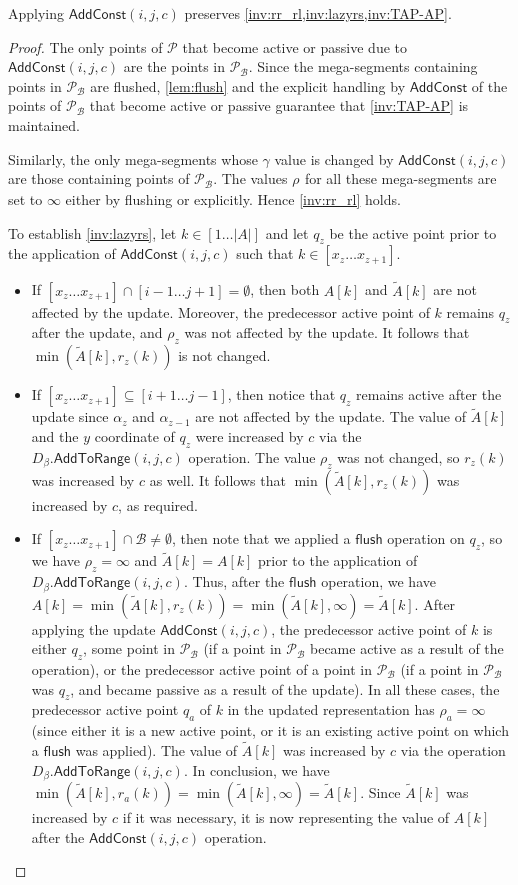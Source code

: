 \documentclass[a4paper,UKenglish,cleveref, autoref, thm-restate]{lipics-v2021}
\newcommand{\AC}{\mathsf{AddConst}}
\newcommand{\AtR}{\mathsf{AddToRange}}
\renewcommand{\P}{\mathcal{P}}
\newcommand{\Dbeta}{D_{\beta}}
\newcommand{\TA}{\tilde{A}}
\newcommand{\B}{\mathcal{B}}
\newcommand{\ray}{r}
\newcommand{\rl}[1]{\rho_{#1}}
\newcommand{\flush}{\mathsf{flush}}
\begin{document}
\begin{lemma}\label{lem:addconst}
    Applying $\AC(i,j,c)$ preserves \cref{inv:rr_rl,inv:lazyrs,inv:TAP-AP}.
\end{lemma}
\begin{proof}
The only points of $\P$ that become active or passive due to $\AC(i,j,c)$ are the points in $\P_{\B}$. Since the mega-segments containing points in $\P_{\B}$ are flushed, \cref{lem:flush} and the explicit handling by $\AC$ of the points of $\P_{\B}$ that become active or passive guarantee that \cref{inv:TAP-AP} is maintained. 

Similarly, the only mega-segments whose $\gamma$ value is changed by $\AC(i,j,c)$ are those containing points of $\P_{\B}$.
The values $\rl{}$ for all these mega-segments are set to $\infty$ either by flushing or explicitly. Hence \cref{inv:rr_rl} holds.

To establish \cref{inv:lazyrs}, 
let $k\in [1\ldots |A|]$ and let $q_z$ be the active point prior to the application of $\AC(i,j,c)$ such that $k\in [x_z \ldots x_{z+1}]$.
\begin{itemize}
    \item If $[x_z \ldots x_{z+1}] \cap [i-1\ldots j + 1] = \emptyset$, then both $A[k]$ and $\TA[k]$  are  not affected by the update.
    Moreover, the predecessor active point of $k$ remains $q_z$ after the update, and $\rl{z}$ was not affected by the update.
    It follows that $\min(\TA[k], \ray_z(k))$ is not changed.
    \item If $[x_z \ldots x_{z+1}] \subseteq [i+1 \ldots j-1]$, then notice that $q_z$ remains active after the update since $\alpha_z$ and $\alpha_{z-1}$ are not affected by the update.
    The value of $\TA[k]$ and the $y$ coordinate of $q_z$ were increased by $c$ via the $\Dbeta.\AtR(i,j,c)$ operation.
    The value $\rl{z}$ was not changed, so $\ray_z(k)$ was increased by $c$ as well.
    It follows that $\min(\TA[k],\ray_z(k))$ was increased by $c$, as required.
    \item If $[x_z \ldots x_{z+1}] \cap \B \neq \emptyset$, then note that we applied a $\flush$ operation on $q_z$, so we have $\rl{z} = \infty$ and $\TA[k] = A[k]$ prior to the application of $\Dbeta.\AtR(i,j,c)$.
    Thus, after the $\flush$ operation, we have $A[k]=\min(\TA[k],\ray_z(k))=\min(\TA[k],\infty)=\TA[k]$.
    After applying the update $\AC(i,j,c)$, the predecessor active point of $k$ is either $q_z$, some point in $\P_{\B}$ (if a point in $\P_{\B}$ became active as a result of the operation), or the predecessor active point of a point in $\P_{\B}$ (if a point in $\P_{\B}$ was $q_z$, and became passive as a result of the update). 
    In all these cases, the predecessor active point $q_a$ of $k$ in the updated representation has $\rl{a} = \infty$ (since either it is a new active point, or it is an existing active point on which a $\flush$ was applied).
    The value of $\TA[k]$ was increased by $c$ via the operation $\Dbeta.\AtR(i,j,c)$. 
    In conclusion, we have $\min(\TA[k],\ray_a(k)) = \min(\TA[k],\infty) = \TA[k]$.
    Since $\TA[k]$ was increased by $c$ if it was necessary, it is now representing the value of $A[k]$ after the $\AC(i,j,c)$ operation.\qedhere 
\end{itemize}


\end{proof}
\end{document}
